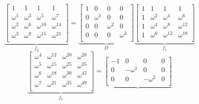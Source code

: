 \documentclass{article}
\begin{document}
\begin{itemize}
\begin{equation*}
        \underbrace{
            \begin{bmatrix}
                1 & 1 & 1 & 1\\
                \omega^1 & \omega^3 & \omega^5    & \omega^7   \\
                \omega^2 & \omega^6 & \omega^{10} & \omega^{14}\\
                \omega^3 & \omega^9 & \omega^{15} & \omega^{21}\\
            \end{bmatrix}
        }_{f_2} = \underbrace{
            \begin{bmatrix}
                1 & 0 & 0 & 0\\
                0 & \omega^1 & 0 & 0\\
                0 & 0 & \omega^2 & 0\\
                0 & 0 & 0 & \omega^3\\
            \end{bmatrix}
        }_D \underbrace{
            \begin{bmatrix}
                1 & 1 & 1 & 1\\
                1 & \omega^2 & \omega^4    & \omega^6   \\
                1 & \omega^4 & \omega^8    & \omega^{12}\\
                1 & \omega^6 & \omega^{12} & \omega^{18}\\
            \end{bmatrix}
        }_{f_1}
    \end{equation*}
    \begin{equation*}
        \underbrace{
            \begin{bmatrix}
                \omega^4 & \omega^{12} & \omega^{20} & \omega^{28}\\
                \omega^5 & \omega^{15} & \omega^{25} & \omega^{35}\\
                \omega^6 & \omega^{18} & \omega^{30} & \omega^{42}\\
                \omega^7 & \omega^{21} & \omega^{35} & \omega^{49}\\
            \end{bmatrix}
        }_{f_4} = \underbrace{
            \begin{bmatrix}
                -1 & 0 & 0 & 0\\
                0 & -\omega^1 & 0 & 0\\
                0 & 0 & -\omega^2 & 0\\

\end{bmatrix}}
\end{equation*}
\end{itemize}
\end{document}
